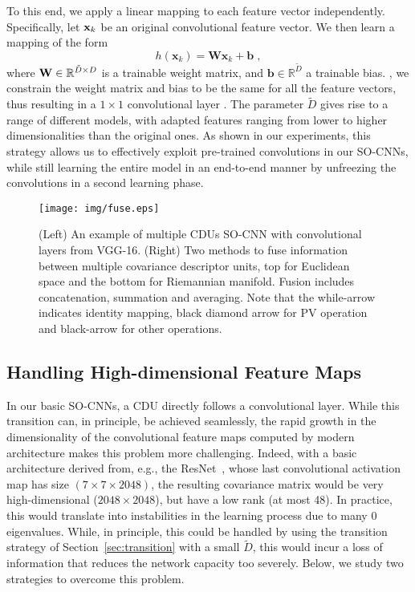 To this end, we apply a linear mapping to each feature vector independently. Specifically, let ${\bf x}_k$ be an original convolutional feature vector. We then learn a mapping of the form
\begin{equation}
h(\mathbf{x}_k) = \mathbf{Wx}_k + \mathbf{b}\;,
\end{equation}
where ${\bf W} \in \mathbb{R}^{\tilde{D}\times D}$ is a trainable weight matrix, and $\mathbf{b} \in \mathbb{R}^{\tilde{D}}$ a trainable bias. , we constrain the weight matrix and bias to be the same for all the feature vectors, thus resulting in a $1 \times 1$ convolutional layer . The parameter $\tilde{D}$ gives rise to a range of different models, with adapted features ranging from lower to higher dimensionalities than the original ones. As shown in our experiments, this strategy allows us to effectively exploit pre-trained convolutions in our SO-CNNs, while still learning the entire model in an end-to-end manner by unfreezing the convolutions in a second learning phase.

\begin{figure}[t]
\begin{center}
   \texttt{[image: img/fuse.eps]}
\end{center}
   \caption{
  (Left) An example of multiple CDUs SO-CNN with convolutional layers from VGG-16.
  (Right) Two methods to fuse information between multiple covariance descriptor units, top for Euclidean space and the bottom for Riemannian manifold. Fusion includes concatenation, summation and averaging. Note that the while-arrow indicates identity mapping, black diamond arrow for PV operation and black-arrow for other operations.
  }
\label{fig:fuse}
\end{figure}

\subsection{Handling High-dimensional Feature Maps}
\label{sec:robust}
In our basic SO-CNNs, a CDU directly follows a convolutional layer. While this transition can, in principle, be achieved seamlessly, the rapid growth in the dimensionality of the convolutional feature maps computed by modern architecture makes this problem more challenging. Indeed, with a basic architecture derived from, e.g., the ResNet~\cite{He:2015tt}, whose last convolutional activation map has size $(7 \times 7 \times 2048)$, the resulting covariance matrix would be very high-dimensional ($2048 \times 2048$), but have a low rank (at most 48). In practice, this would translate into instabilities in the learning process due to many 0 eigenvalues. While, in principle, this could be handled by using the transition strategy of Section~\ref{sec:transition} with a small $\tilde{D}$, this would incur a loss of information that reduces the network capacity too severely.  Below, we study two strategies to overcome this problem.

